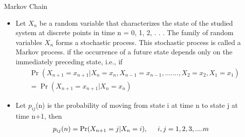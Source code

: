 \documentclass{beamer}
\begin{document}
\begin{frame}
  \begin{block}{Markov Chain}
  \begin{itemize}
    \item Let \(X_n\) be a random variable that characterizes the state of the studied system at discrete points in time n = 0, 1, 2, . . . The family of random variables {\(X_n\)} forms a stochastic process. This stochastic process is called a Markov process.
 if the occurrence of a future state depends only on the immediately preceding state, i.e., if
  \begin{align}
      \Pr(X_{n+1}=x_{n+1}|X_n=x_n, X_{n-1}=x_{n-1},.......,X_2=x_2,X_1=x_1)\nonumber\\=\Pr(X_{n+1}=x_{n+1}|X_n=x_n) \nonumber
  \end{align}
  \item Let \(p_{ij}\)(n) is the probability of moving from state i at time n to state j at time n+1, then
  \begin{align}
      p_{ij}(n) &=\Pr(X_{n+1}=j|X_n=i),\hspace{0.5cm} i,j=1,2,3,....m \nonumber
  \end{align}
  \end{itemize}
    
  \end{block}
    
\end{frame}
\end{document}
